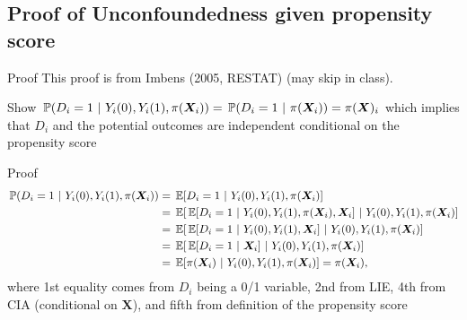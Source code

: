 \documentclass[aspectratio=169,t,11pt,table]{beamer}
\begin{document}
\subsection{Proof of Unconfoundedness given propensity score}


\begin{frame}{Proof}
  This proof is from Imbens (2005, RESTAT) (may skip in class). 
  
  Show $\prob{D_i = 1}{Y_i(0), Y_i(1), \pi(\bm{X}_i)} = \prob{D_i = 1}{\pi(\bm{X}_i)} = \pi(\bm{X})_i$ which implies that $D_i$ and the potential outcomes are independent conditional on the propensity score
\end{frame}

\begin{frame}{Proof}
  \vspace*{-2\bigskipamount}
  \begin{align*}
    \prob{D_i = 1}{Y_i(0), Y_i(1), \pi(\bm{X}_i)} 
    &= \expec{D_i = 1}{Y_i(0), Y_i(1), \pi(\bm{X}_i)} \\ 
    &= \expec{\expec{D_i = 1}{Y_i(0), Y_i(1), \pi(\bm{X}_i), \bm{X}_i}}{Y_i(0), Y_i(1), \pi(\bm{X}_i)} \\
    &= \expec{\expec{D_i = 1}{Y_i(0), Y_i(1), \bm{X}_i}}{Y_i(0), Y_i(1), \pi(\bm{X}_i)} \\
    &= \expec{\expec{D_i = 1}{\bm{X}_i}}{Y_i(0), Y_i(1), \pi(\bm{X}_i)} \\
    &= \expec{\pi(\bm{X}_i)}{Y_i(0), Y_i(1), \pi(\bm{X}_i)} = \pi(\bm{X}_i),
  \end{align*}
  where 1st equality comes from $D_i$ being a 0/1 variable, 2nd from LIE, 4th from CIA (conditional on $\bm{X}$), and fifth from definition of the propensity score
\end{frame}
\end{document}
